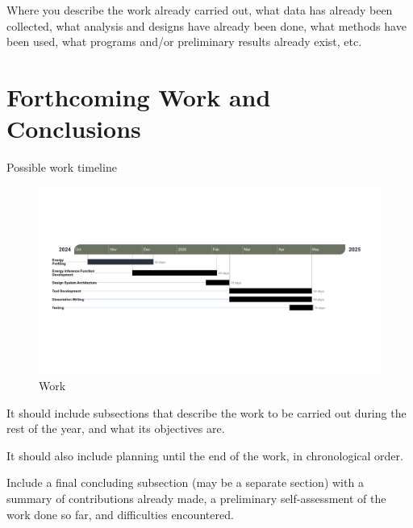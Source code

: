 \documentclass[sigplan]{acmart}
\begin{document}
Where you describe the work already carried out, what data has already been collected, what analysis and designs have already been done, what methods have been used, what programs and/or preliminary results already exist, etc.

\section{Forthcoming Work and Conclusions} \label{sec:conclusions}

Possible work timeline

\begin{figure}[h]
  \centering
  \includegraphics[width = 0.5 \textwidth]{figures/gantt_diagram.png}
  \caption{Work}
  \label{fig:gantt_diagram}
\end{figure}


It should include subsections that describe the work to be carried out during the rest of the year, and what its objectives are.

It should also include planning until the end of the work, in chronological order.

Include a final concluding subsection (may be a separate section) with a summary of contributions already made, a preliminary self-assessment of the work done so far, and difficulties encountered.




\end{document}
